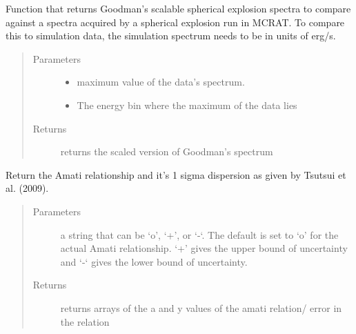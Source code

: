 \documentclass[letterpaper,10pt,english]{sphinxmanual}
\begin{document}
\begin{fulllineitems}
\label{\detokenize{read_process_files:read_process_files.Goodman}}
Function that returns Goodman’s scalable spherical explosion spectra to compare against a spectra acquired by a
spherical explosion run in MCRAT. To compare this to simulation data, the simulation spectrum needs to be in units
of erg/s.
\begin{quote}\begin{description}
\item[{Parameters}] \leavevmode\begin{itemize}
\item {} 
 \textendash{} maximum value of the data’s spectrum.

\item {} 
 \textendash{} The energy bin where the maximum of the data lies

\end{itemize}

\item[{Returns}] \leavevmode
returns the scaled version of Goodman’s spectrum

\end{description}\end{quote}

\end{fulllineitems}


\begin{fulllineitems}
\label{\detokenize{read_process_files:read_process_files.amati}}
Return the Amati relationship and it’s 1 sigma dispersion as given by Tsutsui et al. (2009).
\begin{quote}\begin{description}
\item[{Parameters}] \leavevmode
{} \textendash{} a string that can be ‘o’, ‘+’, or ‘-‘. The default is set to ‘o’ for the actual Amati relationship.
‘+’ gives the upper bound of uncertainty and ‘-‘ gives the lower bound of uncertainty.

\item[{Returns}] \leavevmode
returns arrays of the a and y values of the amati relation/ error in the relation

\end{description}\end{quote}

\end{fulllineitems}
\end{document}

